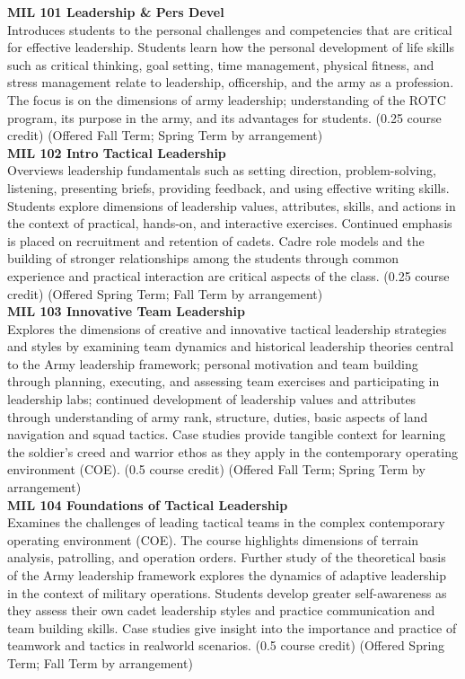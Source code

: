 \documentclass[
  letterpaper,
]{scrbook}
\begin{document}
\textbf{MIL 101 Leadership \& Pers Devel}\\
Introduces students to the personal challenges and competencies that are
critical for effective leadership. Students learn how the personal
development of life skills such as critical thinking, goal setting, time
management, physical fitness, and stress management relate to
leadership, officership, and the army as a profession. The focus is on
the dimensions of army leadership; understanding of the ROTC program,
its purpose in the army, and its advantages for students. (0.25 course
credit) (Offered Fall Term; Spring Term by arrangement)\\
\textbf{MIL 102 Intro Tactical Leadership}\\
Overviews leadership fundamentals such as setting direction,
problem-solving, listening, presenting briefs, providing feedback, and
using effective writing skills. Students explore dimensions of
leadership values, attributes, skills, and actions in the context of
practical, hands-on, and interactive exercises. Continued emphasis is
placed on recruitment and retention of cadets. Cadre role models and the
building of stronger relationships among the students through common
experience and practical interaction are critical aspects of the class.
(0.25 course credit) (Offered Spring Term; Fall Term by arrangement)\\
\textbf{MIL 103 Innovative Team Leadership}\\
Explores the dimensions of creative and innovative tactical leadership
strategies and styles by examining team dynamics and historical
leadership theories central to the Army leadership framework; personal
motivation and team building through planning, executing, and assessing
team exercises and participating in leadership labs; continued
development of leadership values and attributes through understanding of
army rank, structure, duties, basic aspects of land navigation and squad
tactics. Case studies provide tangible context for learning the
soldier's creed and warrior ethos as they apply in the contemporary
operating environment (COE). (0.5 course credit) (Offered Fall Term;
Spring Term by arrangement)\\
\textbf{MIL 104 Foundations of Tactical Leadership}\\
Examines the challenges of leading tactical teams in the complex
contemporary operating environment (COE). The course highlights
dimensions of terrain analysis, patrolling, and operation orders.
Further study of the theoretical basis of the Army leadership framework
explores the dynamics of adaptive leadership in the context of military
operations. Students develop greater self-awareness as they assess their
own cadet leadership styles and practice communication and team building
skills. Case studies give insight into the importance and practice of
teamwork and tactics in realworld scenarios. (0.5 course credit)
(Offered Spring Term; Fall Term by arrangement)
\end{document}
